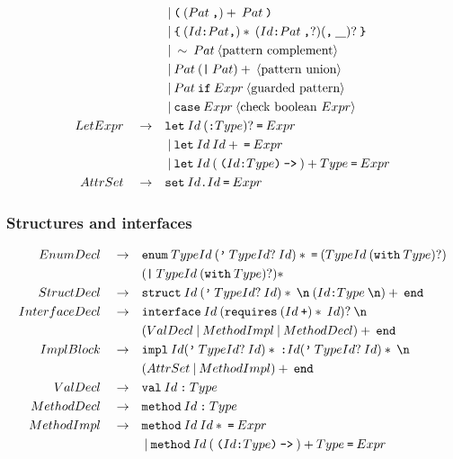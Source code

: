 \documentclass[a4paper, 12pt]{article}
\newcommand{\sepbar}{\: | \:}	%
\newcommand{\substo}{\quad\rightarrow\quad}
\newcommand{\uscore}{\underline{\hspace{0.3cm}}}
\renewcommand{\tt}{\texttt}
\newcommand{\la}{\langle}
\newcommand{\ra}{\rangle}
\begin{document}
\begin{align*}
& \sepbar \tt{(} \: ( Pat\:\tt{,})+\: Pat\: \tt{)}\\
& \sepbar \tt{\{} \: (Id\tt{:}Pat\tt{,})*\: (Id\tt{:}Pat\: \tt{,}?) (\tt{,}\:\uscore)?\: \tt{\}}\\
& \sepbar \sim\:Pat \:\la\text{pattern complement}\ra\\
& \sepbar Pat\: (\tt{|}\: Pat)+\:\la\text{pattern union}\ra\\
& \sepbar Pat\:\tt{if}\: Expr\:\la\text{guarded pattern}\ra\\
& \sepbar \tt{case}\: Expr\:\la\text{check boolean }Expr\ra\\
LetExpr \substo& \tt{let}\: Id \:(\tt{:} Type)? \: \tt{=} \: Expr\\
&\sepbar \tt{let}\: Id \: Id+ \: \tt{=} \: Expr\\
&\sepbar \tt{let}\: Id \: (\: \tt{(} Id\tt{:} Type \tt{)}\: \tt{->} \:)+ Type \: \tt{=}\: Expr\\
AttrSet \substo& \tt{set}\: Id\tt{.}Id\: \tt{=} \:Expr\\
\end{align*}
\subsubsection{Structures and interfaces}
\begin{align*}
EnumDecl \substo& \tt{enum}\: TypeId \: (\tt{'}\: TypeId?\: Id)* \: \texttt{=} \: (TypeId \: (\texttt{with}\: Type)?)\\
&(\texttt{|}\:TypeId \: (\texttt{with}\: Type)?)*\\
StructDecl \substo& \tt{struct}\: Id \: (\tt{'}\: TypeId?\: Id)*\: \tt{\symbol{92}n} \: (Id\tt{:} Type\: \tt{\symbol{92}n})+\: \tt{end}\\
InterfaceDecl \substo& \tt{interface}\: Id\: ( \tt{requires} \: (Id \: \tt{+})*\: Id)? \:  \tt{\symbol{92}n}\\
&(ValDecl \sepbar MethodImpl \sepbar MethodDecl)+\: \tt{end}\\
ImplBlock \substo& \tt{impl}\: Id (\tt{'}\: TypeId?\: Id)* \: \tt{:} Id (\tt{'}\: TypeId?\: Id)* \: \tt{\symbol{92}n}\\
&(AttrSet \sepbar MethodImpl)+\: \tt{end} \\
ValDecl \substo& \tt{val} \: Id\: \tt{:}\: Type \\
MethodDecl \substo& \tt{method} \: Id\: \tt{:} \: Type\\\
MethodImpl \substo& \tt{method} \: Id\: Id*\: \tt{=}\: Expr\\
&\sepbar \tt{method}\: Id \: (\: \tt{(} Id\tt{:} Type \tt{)}\: \tt{->} \:)+ Type \: \tt{=}\: Expr\\
\end{align*}
\end{document}
